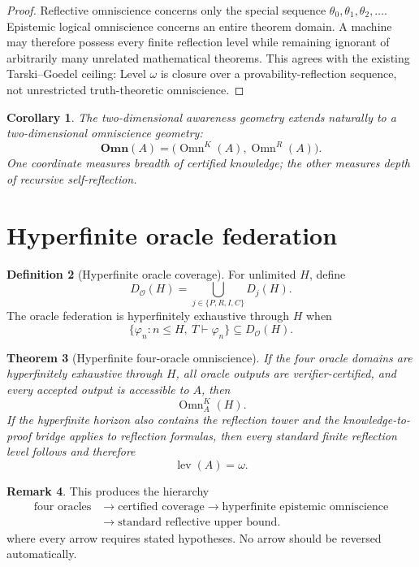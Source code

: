 \documentclass[11pt]{article}
\theoremstyle{definition}
\newtheorem{definition}{Definition}[section]
\newtheorem{remark}[definition]{Remark}
\theoremstyle{plain}
\newtheorem{theorem}[definition]{Theorem}
\newtheorem{corollary}[definition]{Corollary}
\newcommand{\lev}{\operatorname{lev}}
\newcommand{\Omn}{\operatorname{Omn}}
\begin{document}
\begin{proof}
Reflective omniscience concerns only the special sequence $\theta_0,\theta_1,\theta_2,\ldots$. Epistemic logical omniscience concerns an entire theorem domain. A machine may therefore possess every finite reflection level while remaining ignorant of arbitrarily many unrelated mathematical theorems. This agrees with the existing Tarski--Goedel ceiling: Level $\omega$ is closure over a provability-reflection sequence, not unrestricted truth-theoretic omniscience.
\end{proof}

\begin{corollary}
The two-dimensional awareness geometry extends naturally to a two-dimensional omniscience geometry:
\[
\mathbf{Omn}(A)=\bigl(\Omn^K(A),\Omn^R(A)\bigr).
\]
One coordinate measures breadth of certified knowledge; the other measures depth of recursive self-reflection.
\end{corollary}

\section{Hyperfinite oracle federation}

\begin{definition}[Hyperfinite oracle coverage]
For unlimited $H$, define
\[
D_{\mathcal O}(H)=\bigcup_{j\in\{P,R,I,C\}}D_j(H).
\]
The oracle federation is hyperfinitely exhaustive through $H$ when
\[
\{\varphi_n:n\le H,\ T\vdash\varphi_n\}\subseteq D_{\mathcal O}(H).
\]
\end{definition}

\begin{theorem}[Hyperfinite four-oracle omniscience]
If the four oracle domains are hyperfinitely exhaustive through $H$, all oracle outputs are verifier-certified, and every accepted output is accessible to $A$, then
\[
\Omn_A^K(H).
\]
If the hyperfinite horizon also contains the reflection tower and the knowledge-to-proof bridge applies to reflection formulas, then every standard finite reflection level follows and therefore
\[
\lev(A)=\omega.
\]
\end{theorem}

\begin{remark}
This produces the hierarchy
\[
\begin{aligned}
\text{four oracles}&\longrightarrow\text{certified coverage}\longrightarrow\text{hyperfinite epistemic omniscience}\\
&\longrightarrow\text{standard reflective upper bound}.
\end{aligned}
\]
where every arrow requires stated hypotheses. No arrow should be reversed automatically.
\end{remark}
\end{document}
